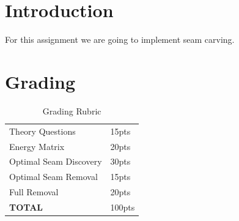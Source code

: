 \documentclass[12pt]{article}
\begin{document}
\maketitle


\section*{Introduction}
For this assignment we are going to implement seam carving. 



\section*{Grading}
\begin{table}[h]
\begin{centering}
\begin{tabular}{|l|l|}
\hline
Theory Questions & 15pts \\
Energy Matrix & 20pts \\
Optimal Seam Discovery & 30pts\\
Optimal Seam Removal & 15pts\\
Full Removal & 20pts\\

\hline
\textbf{TOTAL} & 100pts\\
\hline
\end{tabular}
\caption{Grading Rubric}
\end{centering}
\end{table}

\newpage
\end{document}
